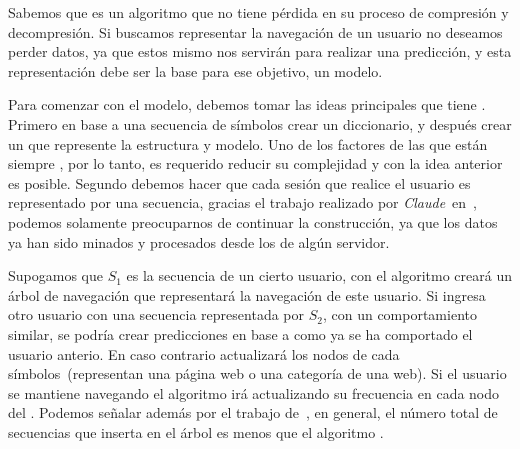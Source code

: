 % 
% 




Sabemos que \lzSieteOcho es un algoritmo que no tiene pérdida en su proceso de compresión y decompresión. Si buscamos representar la navegación de un usuario no deseamos perder datos, ya que estos mismo nos servirán para realizar una predicción, y esta representación debe ser la base para ese objetivo, un modelo.

Para comenzar con el modelo, debemos tomar las ideas principales que tiene \lzSieteOcho. Primero en base a una secuencia de símbolos crear un diccionario, y después crear un \trie que represente la estructura y modelo. Uno de los factores de las \webs que están siempre \online, por lo tanto, es requerido reducir su complejidad y con la idea anterior es posible. Segundo debemos hacer que cada sesión que realice el usuario es representado por una secuencia, gracias el trabajo realizado por \emph{Claude}~\etal en~\cite{Claude2014}, podemos solamente preocuparnos de continuar la construcción, ya que los datos ya han sido minados y procesados desde los \webasccesslog de algún servidor.



Supogamos que $S_{1}$ es la secuencia de un cierto usuario, con el  algoritmo \lzSieteOcho creará un árbol de navegación que representará la navegación de este usuario. Si ingresa otro usuario con una secuencia representada por $S_{2}$, con un comportamiento similar, se podría crear predicciones en base a como ya se ha comportado el usuario anterio. En caso contrario actualizará los nodos de cada símbolos~(representan una página web o una categoría de una web). Si el usuario se mantiene navegando el algoritmo irá actualizando su frecuencia en cada nodo del \trie. Podemos señalar además por el trabajo de~\cite{Begleiter2004}, en general, el número total de secuencias que inserta en el árbol es menos que el algoritmo \PPM.  





